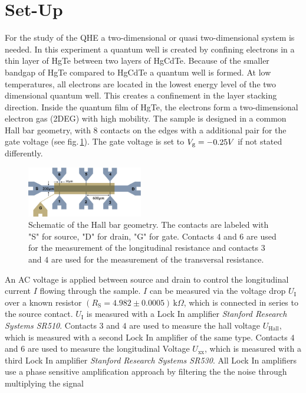 \section{Set-Up}\label{sec:setup}
For the study of the QHE a two-dimensional or quasi two-dimensional system is needed.
In this experiment a quantum well is created by confining electrons in a thin layer of HgTe between
two layers of HgCdTe. Because of the smaller bandgap of HgTe compared to HgCdTe a quantum well is formed. 
At low temperatures, all electrons are located in the lowest energy level of the 
two dimensional quantum well. This creates a confinement in the layer stacking direction.
Inside the quantum film of HgTe, the electrons form a two-dimensional electron gas (2DEG) with high mobility.
The sample is designed in a common Hall bar geometry,
with $8$ contacts on the edges with a additional pair for the gate voltage (see fig.\,\ref{fig:HallBar}).
The gate voltage is set to $V_\text g = -0.25V$ if not stated differently.
\begin{figure}[h]
    \centering
    \includegraphics[width=0.45\textwidth]{../Images/HallBar.png}
    \caption{Schematic of the Hall bar geometry. The contacts are labeled with "S" for source, "D" for drain,
    "G" for gate. Contacts $4$ and $6$ are used for the measurement of the longitudinal resistance 
    and contacts $3$ and $4$ are used for the measurement of the transversal resistance.}
    \label{fig:HallBar}
\end{figure}
An AC voltage is applied between source and drain to control the longitudinal current $I$
flowing through the sample. $I$ can be measured via the voltage drop $U_\text{I}$ over a known resistor $(R_\text{S}=4.982\pm0.0005)\,\text{k}\Omega$, 
which is connected in series to the source contact. $U_\text{I}$ is measured with a Lock In amplifier 
\emph{Stanford Research Systems SR510}. Contacts $3$ and $4$ are used to measure the hall voltage $U_\text{Hall}$, which
is measured with a second Lock In amplifier of the same type. Contacts $4$ and $6$ are used to measure
the longitudinal Voltage $U_\text{xx}$, which is measured with a third Lock In amplifier \emph{Stanford Research Systems SR530}.
All Lock In amplifiers use a phase sensitive amplification approach by filtering the the noise through multiplying the signal
